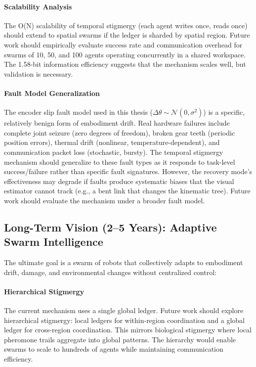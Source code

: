 \documentclass[12pt,a4paper,oneside]{report}
\begin{document}
\paragraph{Scalability Analysis}
The O(N) scalability of temporal stigmergy (each agent writes once, reads once) should extend to spatial swarms if the ledger is sharded by spatial region. Future work should empirically evaluate success rate and communication overhead for swarms of 10, 50, and 100 agents operating concurrently in a shared workspace. The 1.58-bit information efficiency suggests that the mechanism scales well, but validation is necessary.

\paragraph{Fault Model Generalization}
The encoder slip fault model used in this thesis ($\Delta \theta \sim \mathcal{N}(0, \sigma^2)$) is a specific, relatively benign form of embodiment drift. Real hardware failures include complete joint seizure (zero degrees of freedom), broken gear teeth (periodic position errors), thermal drift (nonlinear, temperature-dependent), and communication packet loss (stochastic, bursty). The temporal stigmergy mechanism should generalize to these fault types as it responds to task-level success/failure rather than specific fault signatures. However, the recovery mode's effectiveness may degrade if faults produce systematic biases that the visual estimator cannot track (e.g., a bent link that changes the kinematic tree). Future work should evaluate the mechanism under a broader fault model.

\subsection{Long-Term Vision (2–5 Years): Adaptive Swarm Intelligence}

The ultimate goal is a swarm of robots that collectively adapts to embodiment drift, damage, and environmental changes without centralized control:

\paragraph{Hierarchical Stigmergy}
The current mechanism uses a single global ledger. Future work should explore hierarchical stigmergy: local ledgers for within-region coordination and a global ledger for cross-region coordination. This mirrors biological stigmergy where local pheromone trails aggregate into global patterns. The hierarchy would enable swarms to scale to hundreds of agents while maintaining communication efficiency.
\end{document}
